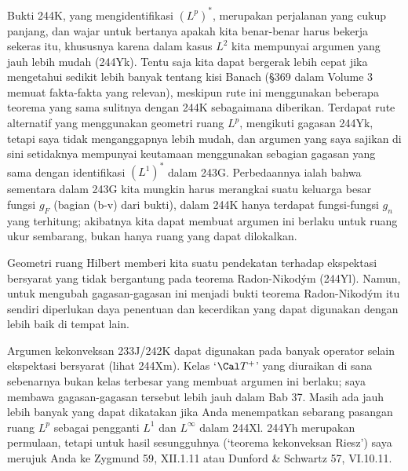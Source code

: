 {Bukti 244K, yang mengidentifikasi $(L^p)^*$, merupakan perjalanan yang
cukup panjang, dan wajar untuk bertanya apakah kita benar-benar harus
bekerja sekeras itu, khususnya karena dalam kasus $L^2$ kita mempunyai
argumen yang jauh lebih mudah (244Yk). Tentu saja kita dapat bergerak
lebih cepat jika mengetahui sedikit lebih banyak tentang kisi Banach
(\S369 dalam Volume 3 memuat fakta-fakta yang relevan), meskipun rute ini
menggunakan beberapa teorema yang sama sulitnya dengan 244K sebagaimana
diberikan. Terdapat rute alternatif yang menggunakan geometri ruang
$L^p$, mengikuti gagasan 244Yk, tetapi saya tidak menganggapnya lebih
mudah, dan argumen yang saya sajikan di sini setidaknya mempunyai
keutamaan menggunakan sebagian gagasan yang sama dengan identifikasi
$(L^1)^*$ dalam 243G. Perbedaannya ialah bahwa sementara dalam 243G kita
mungkin harus merangkai suatu keluarga besar fungsi $g_F$ (bagian (b-v)
dari bukti), dalam 244K hanya terdapat fungsi-fungsi $g_n$ yang
terhitung; akibatnya kita dapat membuat argumen ini berlaku untuk ruang
ukur sembarang, bukan hanya ruang yang dapat dilokalkan.

Geometri ruang Hilbert memberi kita suatu pendekatan terhadap ekspektasi
bersyarat yang tidak bergantung pada teorema Radon-Nikod\'ym (244Yl).
Namun, untuk mengubah gagasan-gagasan ini menjadi bukti teorema
Radon-Nikod\'ym itu sendiri diperlukan daya penentuan dan kecerdikan yang
dapat digunakan dengan lebih baik di tempat lain.

Argumen kekonveksan 233J/242K dapat digunakan pada banyak operator selain
ekspektasi bersyarat (lihat 244Xm). Kelas `$\Cal T^+$' yang diuraikan di
sana sebenarnya bukan kelas terbesar yang membuat argumen ini berlaku;
saya membawa gagasan-gagasan tersebut lebih jauh dalam Bab 37. Masih ada
jauh lebih banyak yang dapat dikatakan jika Anda menempatkan sebarang
pasangan ruang $L^p$ sebagai pengganti $L^1$ dan $L^{\infty}$ dalam
244Xl. 244Yh merupakan permulaan, tetapi untuk hasil sesungguhnya
(`teorema kekonveksan Riesz') saya merujuk Anda ke {\smc Zygmund 59},
XII.1.11 atau {\smc Dunford \& Schwartz 57}, VI.10.11.
}%


\discrpage
